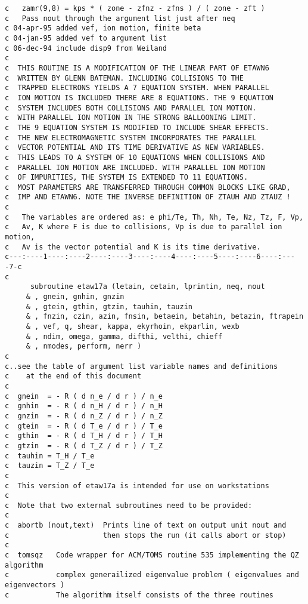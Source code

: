 \begin{verbatim}
c   zamr(9,8) = kps * ( zone - zfnz - zfns ) / ( zone - zft )
c   Pass nout through the argument list just after neq
c 04-apr-95 added vef, ion motion, finite beta
c 04-jan-95 added vef to argument list
c 06-dec-94 include disp9 from Weiland
c
c  THIS ROUTINE IS A MODIFICATION OF THE LINEAR PART OF ETAWN6
c  WRITTEN BY GLENN BATEMAN. INCLUDING COLLISIONS TO THE
c  TRAPPED ELECTRONS YIELDS A 7 EQUATION SYSTEM. WHEN PARALLEL
c  ION MOTION IS INCLUDED THERE ARE 8 EQUATIONS. THE 9 EQUATION
c  SYSTEM INCLUDES BOTH COLLISIONS AND PARALLEL ION MOTION.
c  WITH PARALLEL ION MOTION IN THE STRONG BALLOONING LIMIT.
c  THE 9 EQUATION SYSTEM IS MODIFIED TO INCLUDE SHEAR EFFECTS.
c  THE NEW ELECTROMAGNETIC SYSTEM INCORPORATES THE PARALLEL
c  VECTOR POTENTIAL AND ITS TIME DERIVATIVE AS NEW VARIABLES.
c  THIS LEADS TO A SYSTEM OF 10 EQUATIONS WHEN COLLISIONS AND
c  PARALLEL ION MOTION ARE INCLUDED. WITH PARALLEL ION MOTION
c  OF IMPURITIES, THE SYSTEM IS EXTENDED TO 11 EQUATIONS.
c  MOST PARAMETERS ARE TRANSFERRED THROUGH COMMON BLOCKS LIKE GRAD,
c  IMP AND ETAWN6. NOTE THE INVERSE DEFINITION OF ZTAUH AND ZTAUZ !
c
c   The variables are ordered as: e phi/Te, Th, Nh, Te, Nz, Tz, F, Vp, 
c   Av, K where F is due to collisions, Vp is due to parallel ion motion,
c   Av is the vector potential and K is its time derivative.
c---:----1----:----2----:----3----:----4----:----5----:----6----:----7-c
c
      subroutine etaw17a (letain, cetain, lprintin, neq, nout
     & , gnein, gnhin, gnzin
     & , gtein, gthin, gtzin, tauhin, tauzin
     & , fnzin, czin, azin, fnsin, betaein, betahin, betazin, ftrapein
     & , vef, q, shear, kappa, ekyrhoin, ekparlin, wexb
     & , ndim, omega, gamma, difthi, velthi, chieff
     & , nmodes, perform, nerr )
c
c..see the table of argument list variable names and definitions
c    at the end of this document
c
c  gnein  = - R ( d n_e / d r ) / n_e
c  gnhin  = - R ( d n_H / d r ) / n_H
c  gnzin  = - R ( d n_Z / d r ) / n_Z
c  gtein  = - R ( d T_e / d r ) / T_e
c  gthin  = - R ( d T_H / d r ) / T_H
c  gtzin  = - R ( d T_Z / d r ) / T_Z
c  tauhin = T_H / T_e
c  tauzin = T_Z / T_e
c
c  This version of etaw17a is intended for use on workstations
c
c  Note that two external subroutines need to be provided:
c
c  abortb (nout,text)  Prints line of text on output unit nout and
c                      then stops the run (it calls abort or stop)
c
c  tomsqz   Code wrapper for ACM/TOMS routine 535 implementing the QZ algorithm
c           complex generailized eigenvalue problem ( eigenvalues and eigenvectors ) 
c           The algorithm itself consists of the three routines 

\end{verbatim}
